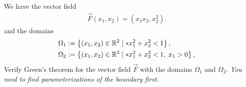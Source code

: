 \documentclass[11pt]{article}
\begin{document}



\begin{exercise}
    We have the vector field 
    \begin{gather*}
        \vec F( x_1, x_2 ) = \left( x_1 x_2, x_2^{2} \right).
    \end{gather*}
    and the domains 
    \begin{align*}
        \Omega_1 &:= \left\{ (x_1,x_2) \in \bbR^{2} \suchthat* x_1^{2} + x_2^{2} < 1 \right\},
        \\
        \Omega_2 &:= \left\{ (x_1,x_2) \in \bbR^{2} \suchthat* x_1^{2} + x_2^{2} < 1, \; x_1 > 0 \right\},
     \end{align*}
    Verify Green's theorem for the vector field $\vec F$ with the domains $\Omega_1$ and $\Omega_2$. 
    \textit{You need to find parameterizations of the boundary first.}
\end{exercise}
\end{document}
